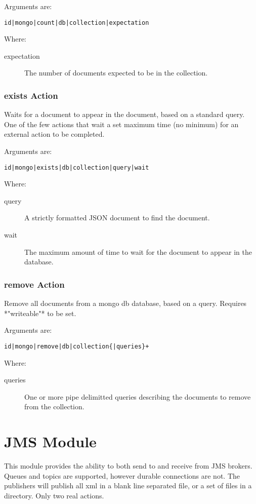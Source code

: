 \documentclass[12pt,a4paper,koma]{article}
\begin{document}
Arguments are:
\begin{verbatim}
id|mongo|count|db|collection|expectation
\end{verbatim}

Where:
\begin{description}
\item[{expectation}] The number of documents expected to be in the collection.
\end{description}
\subsubsection{exists Action}
\label{sec-3-2-3}
Waits for a document to appear in the document, based on a standard query.
One of the few actions that wait a set maximum time (no minimum) for an
external action to be completed.

Arguments are:
\begin{verbatim}
id|mongo|exists|db|collection|query|wait
\end{verbatim}

Where:
\begin{description}
\item[{query}] A strictly formatted JSON document to find the document.
\item[{wait}] The maximum amount of time to wait for the document to appear
in the database.
\end{description}
\subsubsection{remove Action}
\label{sec-3-2-4}
Remove all documents from a mongo db database, based on a query. Requires
*"writeable"* to be set.

Arguments are:
\begin{verbatim}
id|mongo|remove|db|collection{|queries}+
\end{verbatim}

Where:
\begin{description}
\item[{queries}] One or more pipe delimitted queries describing the documents
to remove from the collection.
\end{description}
\section{JMS Module}
\label{sec-4}
This module provides the ability to both send to and receive from JMS brokers.
Queues and topics are supported, however durable connections are not. The
publishers will publish all xml in a blank line separated file, or a set of
files in a directory. Only two real actions.
\end{document}
